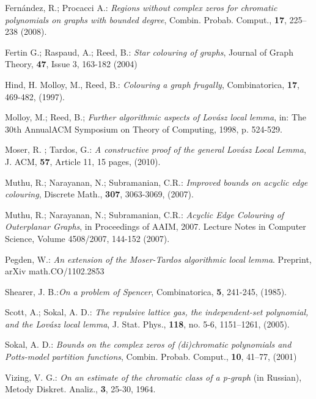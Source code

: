 \documentclass[11pt]{article}
\begin{document}
\begin{thebibliography}{99}
{ Fern\'andez, R.; Procacci A.: {\it
   Regions without complex zeros for chromatic polynomials
   on graphs with bounded degree},
   Combin. Probab. Comput., {\bf 17}, 225--238 (2008).

 Fertin G.; Raspaud, A.; Reed, B.: {\it Star colouring of graphs}, Journal of Graph Theory, {\bf 47}, Issue 3, 163-182 (2004)


 Hind, H. Molloy, M., Reed, B.: {\it Colouring a graph frugally}, Combinatorica, {\bf 17}, 469-482, (1997).



 Molloy, M.;  Reed, B.; {\it Further algorithmic aspects of Lov\'asz local lemma}, in: The 30th AnnualACM Symposium on Theory of Computing, 1998,
p. 524-529.

  Moser, R. ; Tardos, G.: {\it A constructive proof of the general Lov\'asz Local
Lemma}, J. ACM, {\bf 57},  Article 11, 15 pages, (2010).

 Muthu, R.; Narayanan, N.; Subramanian,  C.R.:
{\it Improved bounds on acyclic edge colouring}, Discrete Math., {\bf 307}, 3063-3069, (2007).

 Muthu, R.; Narayanan, N.; Subramanian,  C.R.: {\it Acyclic Edge Colouring of Outerplanar Graphs},
in  Proceedings of AAIM, 2007.
Lecture Notes in Computer Science, Volume 4508/2007, 144-152 (2007).

 Pegden, W.: {\it An extension of the Moser-Tardos algorithmic local lemma}. Preprint, arXiv math.CO/1102.2853



 Shearer, J. B.:{\it On a problem of Spencer},
Combinatorica, {\bf 5}, 241-245, (1985).


  Scott, A.; Sokal, A. D.: {\it The repulsive lattice gas,
the independent-set polynomial, and the Lov\'asz local lemma},
 J. Stat. Phys.,  {\bf 118}, no. 5-6, 1151--1261, (2005).

  Sokal, A. D.: {\it
Bounds on the complex zeros of (di)chromatic polynomials and
Potts-model partition functions},
Combin. Probab. Comput., {\bf 10}, 41--77, (2001)

 Vizing, V. G.: {\it On an estimate of the chromatic class of a p-graph} (in Russian), Metody Diskret.
Analiz., {\bf 3}, 25-30, 1964.
}

\end{thebibliography}
\end{document}
